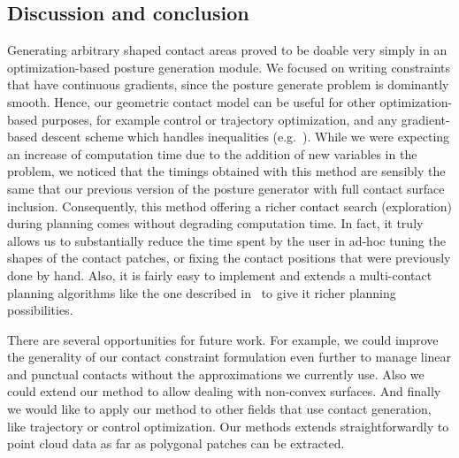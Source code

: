 \subsection{Discussion and conclusion}
Generating arbitrary shaped contact areas proved to be doable very simply in an optimization-based posture generation module.
We focused on writing constraints that have continuous gradients, since the posture generate problem is dominantly smooth.
Hence, our geometric contact model can be useful for other optimization-based purposes, for example control or trajectory optimization, and any gradient-based descent scheme which handles inequalities (e.g.~\cite{escande:icra:2010}).
While we were expecting an increase of computation time due to the addition of new variables in the problem,
we noticed that the timings obtained with this method are sensibly the same that our previous version of the posture generator with full contact surface inclusion.
Consequently, this method offering a richer contact search (exploration) during planning comes without degrading computation time.
In fact, it truly allows us to substantially reduce the time spent by the user in ad-hoc tuning the shapes of the contact patches, or fixing the contact positions that were previously done by hand.
Also, it is fairly easy to implement and extends a multi-contact planning algorithms like the one described in~\cite{escande:ras:2013}{} to give it richer planning possibilities.

There are several opportunities for future work.
For example, we could improve the generality of our contact constraint formulation even further to manage linear and punctual contacts without the approximations we currently use.
Also we could extend our method to allow dealing with non-convex surfaces.
And finally we would like to apply our method to other fields that use contact generation, like trajectory or control optimization.
Our methods extends straightforwardly to point cloud data as far as polygonal patches can be extracted.

